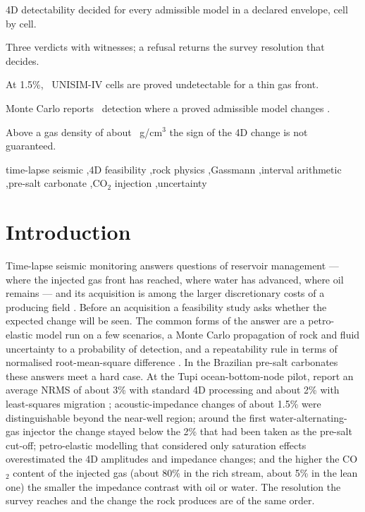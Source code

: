 \documentclass[preprint,11pt,authoryear]{elsarticle}
\begin{document}
\begin{frontmatter}
\begin{highlights}
\item 4D detectability decided for every admissible model in a declared envelope, cell by cell.
\item Three verdicts with witnesses; a refusal returns the survey resolution that decides.
\item At 1.5\%, \DThinRefutedZero\ UNISIM-IV cells are proved undetectable for a thin gas front.
\item Monte Carlo reports \DMcFourTenKP\ detection where a proved admissible model changes \DKFourAttLo.
\item Above a gas density of about \DSignMedian\ g/cm$^3$ the sign of the 4D change is not guaranteed.
\end{highlights}

\begin{keyword}
time-lapse seismic \sep 4D feasibility \sep rock physics \sep Gassmann \sep interval arithmetic \sep pre-salt carbonate \sep CO$_2$ injection \sep uncertainty
\end{keyword}

\end{frontmatter}

\section{Introduction}\label{sec:intro}

Time-lapse seismic monitoring answers questions of reservoir management --- where the injected gas front has reached, where water has advanced, where oil remains --- and its acquisition is among the larger discretionary costs of a producing field \citep{lumley2001}. Before an acquisition a feasibility study asks whether the expected change will be seen. The common forms of the answer are a petro-elastic model run on a few scenarios, a Monte Carlo propagation of rock and fluid uncertainty to a probability of detection, and a repeatability rule in terms of normalised root-mean-square difference \citep{kragh2002,costa2019,silva2025,silva2026}. In the Brazilian pre-salt carbonates these answers meet a hard case. At the Tupi ocean-bottom-node pilot, \citet{cruz2021a,cruz2021b} report an average NRMS of about 3\% with standard 4D processing and about 2\% with least-squares migration \citep{cypriano2019}; acoustic-impedance changes of about 1.5\% were distinguishable beyond the near-well region; around the first water-alternating-gas injector the change stayed below the 2\% that had been taken as the pre-salt cut-off; petro-elastic modelling that considered only saturation effects overestimated the 4D amplitudes and impedance changes; and the higher the CO$_2$ content of the injected gas (about 80\% in the rich stream, about 5\% in the lean one) the smaller the impedance contrast with oil or water. The resolution the survey reaches and the change the rock produces are of the same order.
\end{document}
